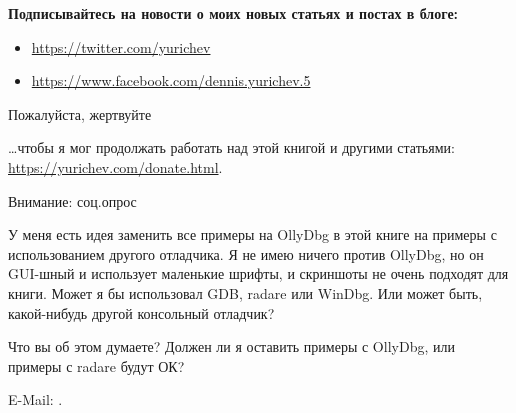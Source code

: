 \vspace*{\fill}

\vspace*{\fill}

\normalsize \textbf{Подписывайтесь на новости о моих новых статьях и постах в блоге:}

\bigskip
\bigskip
\bigskip

\begin{itemize}

\item \url{https://twitter.com/yurichev}

\item \url{https://www.facebook.com/dennis.yurichev.5}

\end{itemize}

\bigskip
\bigskip
\bigskip
\huge Пожалуйста, жертвуйте
\normalsize

\bigskip
\bigskip
\bigskip

\dots чтобы я мог продолжать работать над этой книгой и другими статьями: \\
\url{https://yurichev.com/donate.html}.

\bigskip
\bigskip
\bigskip

\huge Внимание: соц.опрос
\normalsize

\bigskip
\bigskip
\bigskip

У меня есть идея заменить все примеры на OllyDbg в этой книге на примеры с использованием другого отладчика.
Я не имею ничего против OllyDbg, но он GUI-шный и использует маленькие шрифты, и скриншоты не очень подходят для книги.
Может я бы использовал GDB, radare или WinDbg.
Или может быть, какой-нибудь другой консольный отладчик?

Что вы об этом думаете?
Должен ли я оставить примеры с OllyDbg, или примеры с radare будут ОК?

E-Mail: \GTT{\EMAIL}.

\vspace*{\fill}
\vfill
